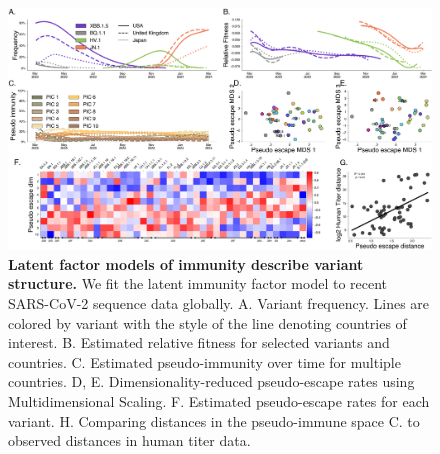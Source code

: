 \documentclass[11pt,oneside,letterpaper]{article}
\def\tbc#1{\textcolor{purple}{[#1]}}
\begin{document}
\begin{figure}[h]
    \centering
    \includegraphics[width=1.0\linewidth]{./figures/latent_immune.png}
    \caption{
      \textbf{Latent factor models of immunity describe variant structure.}
      We fit the latent immunity factor model to recent SARS-CoV-2 sequence data globally.
      A. Variant frequency. Lines are colored by variant with the style of the line denoting countries of interest.
      B. Estimated relative fitness for selected variants and countries.
      C. Estimated pseudo-immunity over time for multiple countries.
      D, E. Dimensionality-reduced pseudo-escape rates using Multidimensional Scaling.
      F. Estimated pseudo-escape rates for each variant.
      H. Comparing distances in the pseudo-immune space C. to observed distances in human titer data.
    }
    \label{fig:latent_immune}
\end{figure}
\end{document}
